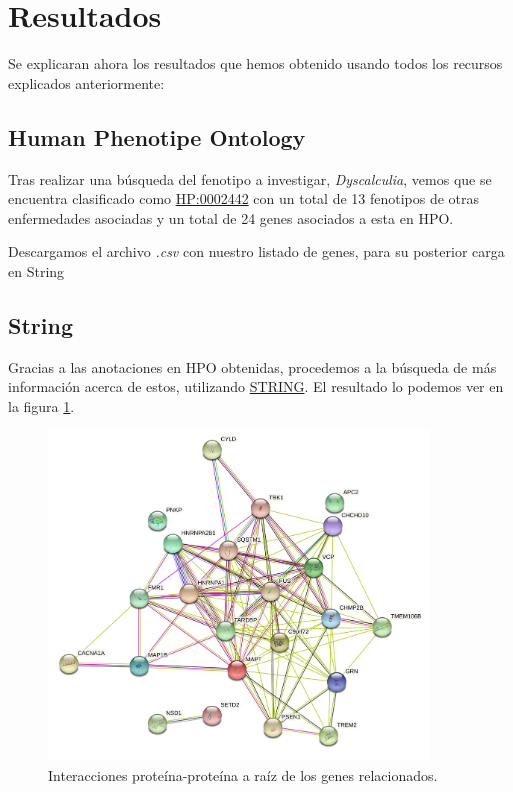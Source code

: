 

\section{Resultados}

Se explicaran ahora los resultados que hemos obtenido usando todos los recursos explicados anteriormente:

\subsection{Human Phenotipe Ontology}

\hfill

Tras realizar una búsqueda del fenotipo a investigar, \textit{Dyscalculia}, vemos que se encuentra clasificado como \href{https://hpo.jax.org/app/browse/term/HP:0002442}{HP:0002442} con un total de 13 fenotipos de otras enfermedades asociadas y un total de 24 genes asociados a esta en HPO.

Descargamos el archivo \textit{.csv} con nuestro listado de genes, para su posterior carga en String

\subsection{String}

\hfill

Gracias a las anotaciones en HPO obtenidas, procedemos a la búsqueda de más información acerca de estos, utilizando \href{https://string-db.org}{STRING}. El resultado lo podemos ver en la figura \ref{fig:string1}.

\begin{figure}[h]
	\centering
	\includegraphics[width=0.90\textwidth]{figures/Gene_Relationship.png}
	\caption{Interacciones proteína-proteína a raíz de los genes relacionados. }
	\label{fig:string1}
\end{figure}

